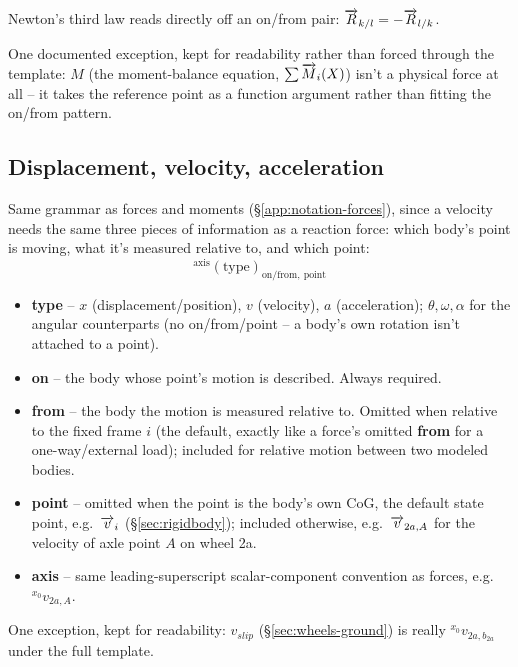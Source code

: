 Newton's third law reads directly off an on/from pair: $\overrightarrow{R}_{k/l} = -\overrightarrow{R}_{l/k}$.

One documented exception, kept for readability rather than forced through the template: $M$ (the moment-balance equation, $\sum\overrightarrow{M}_i(X)$) isn't a physical force at all -- it takes the reference point as a function argument rather than fitting the on/from pattern.

\subsection{Displacement, velocity, acceleration}
\label{app:notation-kinematics}
Same grammar as forces and moments (\S\ref{app:notation-forces}), since a velocity needs the same three pieces of information as a reaction force: which body's point is moving, what it's measured relative to, and which point:
\begin{equation}
    {}^{\text{axis}}(\text{type})_{\text{on}/\text{from},\ \text{point}}
\end{equation}
\begin{itemize}
    \item \textbf{type} -- $x$ (displacement/position), $v$ (velocity), $a$ (acceleration); $\theta,\omega,\alpha$ for the angular counterparts (no on/from/point -- a body's own rotation isn't attached to a point).
    \item \textbf{on} -- the body whose point's motion is described. Always required.
    \item \textbf{from} -- the body the motion is measured relative to. Omitted when relative to the fixed frame $i$ (the default, exactly like a force's omitted \textbf{from} for a one-way/external load); included for relative motion between two modeled bodies.
    \item \textbf{point} -- omitted when the point is the body's own CoG, the default state point, e.g.\ $\overrightarrow{v}_i$ (\S\ref{sec:rigidbody}); included otherwise, e.g.\ $\overrightarrow{v}_{2a,A}$ for the velocity of axle point $A$ on wheel 2a.
    \item \textbf{axis} -- same leading-superscript scalar-component convention as forces, e.g.\ ${}^{x_0}v_{2a,A}$.
\end{itemize}
One exception, kept for readability: $v_{slip}$ (\S\ref{sec:wheels-ground}) is really ${}^{x_0}v_{2a,b_{2a}}$ under the full template.

